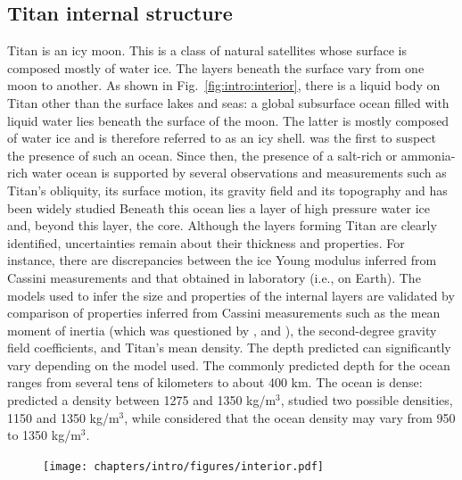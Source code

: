 \subsection{Titan internal structure}
\label{sec:intro:depth}
Titan is an icy moon. This is a class of natural satellites whose surface is composed mostly of water ice. The layers beneath the surface vary from one moon to another. As shown in Fig.~\ref{fig:intro:interior}, there is a liquid body on Titan other than the surface lakes and seas: a global subsurface ocean filled with liquid water lies beneath the surface of the moon. The latter is mostly composed of water ice and is therefore referred to as an icy shell. \citet{stevenson1992interior} was the first to suspect the presence of such an ocean. Since then, the presence of a salt-rich or ammonia-rich water ocean is supported by several observations and measurements such as Titan's obliquity, its surface motion, its gravity field and its topography \citep{rappaport2008can,nimmo2010shell,iess2012tides,hemingway2013rigid,lefevre2014structure,baland2011titan,baland2014titan}
and has been widely studied \citep{beuthe2008thin,beuthe2015tides,beuthe2015tidal,fortes2012titan,sohl1995tidal,sohl2003interior,sohl2014structural}
Beneath this ocean lies a layer of high pressure water ice and, beyond this layer, the core. Although the layers forming Titan are clearly identified, uncertainties remain about their thickness and properties. For instance, there are discrepancies between the ice Young modulus inferred from Cassini measurements and that obtained in laboratory (i.e., on Earth). The models used to infer the size and properties of the internal layers are validated by comparison of properties inferred from Cassini measurements such as the mean moment of inertia (which was questioned by \citet{hemingway2013rigid}, \citet{baland2014titan} and \citet{lefevre2014structure}), the second-degree gravity field coefficients, and Titan's mean density. The depth predicted can significantly vary depending on the model used. The commonly predicted depth for the ocean ranges from several tens of kilometers to about 400 km. The ocean is dense: \citet{baland2014titan} predicted a density between 1275 and 1350 kg/m$^3$, \citet{sohl2014structural} studied two possible densities, 1150 and 1350 kg/m$^3$, while \citet{coyette2018variations} considered that the ocean density may vary from 950 to 1350 kg/m$^3$.

\begin{figure}
\begin{center}
\texttt{[image: chapters/intro/figures/interior.pdf]}
~ \\
\end{center}
\end{figure}

